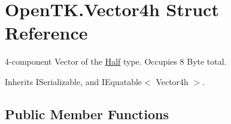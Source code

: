 \hypertarget{struct_open_t_k_1_1_vector4h}{\section{Open\-T\-K.\-Vector4h Struct Reference}
\label{struct_open_t_k_1_1_vector4h}
}


4-\/component Vector of the \hyperlink{struct_open_t_k_1_1_half}{Half} type. Occupies 8 Byte total.  




Inherits I\-Serializable, and I\-Equatable$<$ Vector4h $>$.

\subsection*{Public Member Functions}
